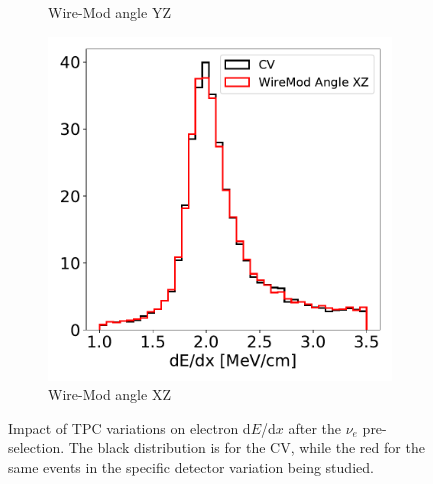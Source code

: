\documentclass[a4paper]{article}
\newcommand{\dedx}{d$E$/d$x$\xspace}
\begin{document}
\begin{figure}[H]
\begin{center}
\begin{subfigure}[b]{0.19\textwidth}
    \caption{\label{fig:detsys:dedx:WMAYZ}Wire-Mod angle YZ}
    \end{subfigure}
    \begin{subfigure}[b]{0.19\textwidth}
    \centering
    \includegraphics[width=1.00\textwidth]{detsys/dedx/shr_tkfit_dedx_max_03232020_WireMod_Angle_XZ.pdf}
    \caption{\label{fig:detsys:dedx:WMAXZ}Wire-Mod angle XZ}
    \end{subfigure}
\caption{\label{fig:detsys:dedx}Impact of TPC variations on electron \dedx after the $\nu_e$ pre-selection. The black distribution is for the CV, while the red for the same events in the specific detector variation being studied.}
\end{center}
\end{figure}
\end{document}
